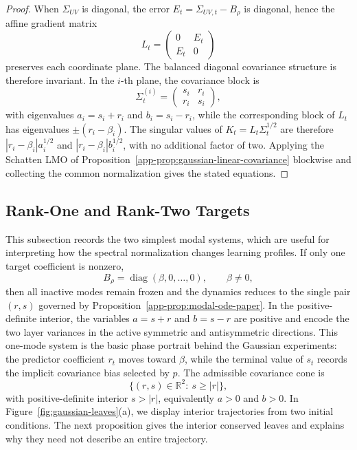 \documentclass{article}
\newcommand{\R}{\mathbb{R}}
\newcommand{\diag}{\operatorname{diag}}
\newcommand{\abs}[1]{\left\lvert #1 \right\rvert}
\begin{document}
\begin{proof}
When $\Sigma_{UV}$ is diagonal, the error
$E_t=\Sigma_{UV,t}-B_\rho$ is diagonal, hence the affine gradient matrix
$$
L_t=
\begin{pmatrix}
0 & E_t\\ E_t & 0
\end{pmatrix}
$$
preserves each coordinate plane. The balanced diagonal covariance structure is therefore invariant. In the $i$-th plane, the covariance block is
$$
\Sigma_t^{(i)}=\begin{pmatrix}s_i&r_i\\ r_i&s_i\end{pmatrix},
$$
with eigenvalues $a_i=s_i+r_i$ and $b_i=s_i-r_i$, while the corresponding block of $L_t$ has eigenvalues $\pm(r_i-\beta_i)$. The singular values of $K_t=L_t\Sigma_t^{1/2}$ are therefore $\abs{r_i-\beta_i}a_i^{1/2}$ and $\abs{r_i-\beta_i}b_i^{1/2}$, with no additional factor of two. Applying the Schatten LMO of Proposition~\ref{app-prop:gaussian-linear-covariance} blockwise and collecting the common normalization gives the stated equations.
\end{proof}



\subsection{Rank-One and Rank-Two Targets}
This subsection records the two simplest modal systems, which are useful for interpreting how the spectral normalization changes learning profiles.
If only one target coefficient is nonzero,
$$
B_\rho=\diag(\beta,0,\dots,0),
\qquad \beta\neq 0,
$$
then all inactive modes remain frozen and the dynamics reduces to the single
pair $(r,s)$ governed by Proposition~\ref{app-prop:modal-ode-paper}. In the
positive-definite interior, the variables $a=s+r$ and $b=s-r$ are positive
and encode the two layer variances in the active symmetric and antisymmetric
directions. This one-mode system is the basic phase portrait behind the
Gaussian experiments: the predictor coefficient $r_t$ moves toward $\beta$,
while the terminal value of $s_t$ records the implicit covariance bias
selected by $p$.
The admissible covariance cone is
$$
\{(r,s)\in\R^2:\ s\ge|r|\},
$$
with positive-definite interior $s>|r|$, equivalently $a>0$ and $b>0$. In
Figure~\ref{fig:gaussian-leaves}(a), we display interior trajectories from two
initial conditions. The next proposition gives the interior conserved leaves
and explains why they need not describe an entire trajectory.
\end{document}
